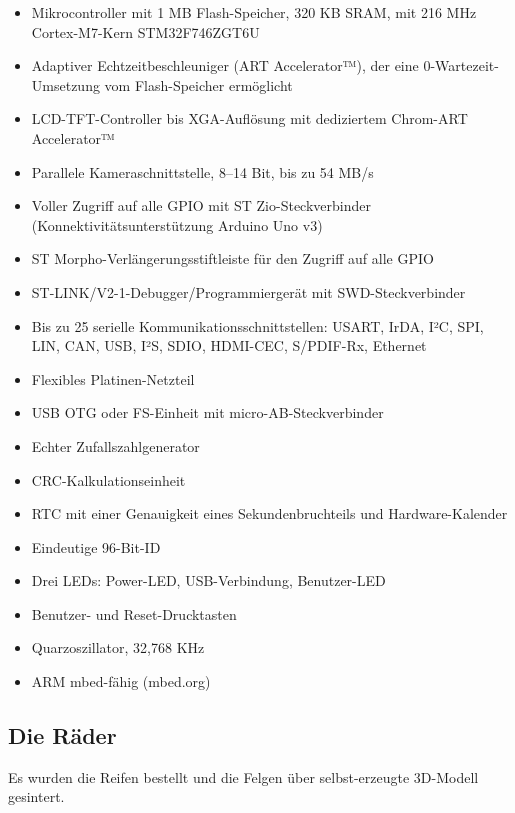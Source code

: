 \begin{itemize} 
	\item Mikrocontroller mit 1 MB Flash-Speicher, 320 KB SRAM, mit 216 MHz Cortex-M7-Kern STM32F746ZGT6U
	\item Adaptiver Echtzeitbeschleuniger (ART Accelerator™), der eine 0-Wartezeit-Umsetzung vom Flash-Speicher ermöglicht
	\item LCD-TFT-Controller bis XGA-Auflösung mit dediziertem Chrom-ART Accelerator™
	\item Parallele Kameraschnittstelle, 8–14 Bit, bis zu 54 MB/s
	\item Voller Zugriff auf alle GPIO mit ST Zio-Steckverbinder (Konnektivitätsunterstützung Arduino Uno v3)
	\item ST Morpho-Verlängerungsstiftleiste für den Zugriff auf alle GPIO
	\item ST-LINK/V2-1-Debugger/Programmiergerät mit SWD-Steckverbinder
	\item Bis zu 25 serielle Kommunikationsschnittstellen: USART, IrDA, I²C, SPI, LIN, CAN, USB, I²S, SDIO, HDMI-CEC, S/PDIF-Rx, Ethernet
	\item Flexibles Platinen-Netzteil
	\item USB OTG oder FS-Einheit mit micro-AB-Steckverbinder
	\item Echter Zufallszahlgenerator
	\item CRC-Kalkulationseinheit
	\item RTC mit einer Genauigkeit eines Sekundenbruchteils und Hardware-Kalender
	\item Eindeutige 96-Bit-ID
	\item Drei LEDs: Power-LED, USB-Verbindung, Benutzer-LED
	\item Benutzer- und Reset-Drucktasten
	\item Quarzoszillator, 32,768 KHz
	\item ARM mbed-fähig (mbed.org)
	
\end{itemize}


\subsection{Die Räder}

Es wurden die Reifen bestellt und die Felgen über selbst-erzeugte 3D-Modell gesintert.

